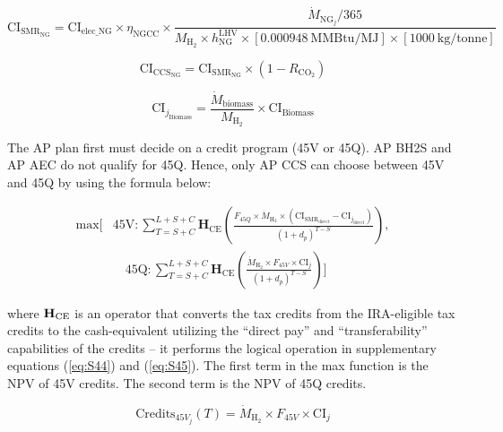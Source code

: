 \documentclass{article}
\begin{document}
\begin{equation}
\text{CI}_{\text{SMR}_{\text{NG}}} = \text{CI}_{\text{elec\_NG}} \times \eta_{\text{NGCC}} \times \frac{\dot{M}_{\text{NG}_j}/365}{M_{\text{H}_2} \times h_{\text{NG}}^{\text{LHV}} \times [0.000948 \ \text{MMBtu/MJ}] \times [1000 \ \text{kg/tonne}]}
\label{eq:S38}
\end{equation}

\begin{equation}
\text{CI}_{\text{CCS}_{\text{NG}}} = \text{CI}_{\text{SMR}_{\text{NG}}} \times (1 - R_{\text{CO}_2})
\label{eq:S39}
\end{equation}

\begin{equation}
\text{CI}_{j_{\text{Biomass}}} = \frac{\dot{M}_{\text{biomass}}}{M_{\text{H}_2}} \times \text{CI}_{\text{Biomass}}
\label{eq:S40}
\end{equation}

The AP plan first must decide on a credit program (45V or 45Q). AP BH2S and AP AEC do not qualify for 45Q. Hence, only AP CCS can choose between 45V and 45Q by using the formula below:

\begin{equation}
\begin{aligned}
\text{max}\Bigg[& \text{45V} : \sum_{T=S+C}^{L+S+C} \mathbf{H}_{\text{CE}} \left(\frac{F_{45Q} \times \dot{M}_{\text{H}_2} \times (\text{CI}_{\text{SMR}_{\text{direct}}} - \text{CI}_{j_{\text{direct}}})}{(1 + d_p)^{T-S}}\right), \\
& \quad \text{45Q} : \sum_{T=S+C}^{L+S+C} \mathbf{H}_{\text{CE}} \left(\frac{\dot{M}_{\text{H}_2} \times F_{45V} \times \text{CI}_j}{(1 + d_p)^{T-S}}\right) \Bigg]
\end{aligned}
\label{eq:S41}
\end{equation}

where \( \textbf{H}\textsubscript{CE} \) is an operator that converts the tax credits from the IRA-eligible tax credits to the cash-equivalent utilizing the “direct pay” and “transferability” capabilities of the credits – it performs the logical operation in supplementary equations (\ref{eq:S44}) and (\ref{eq:S45}). The first term in the max function is the NPV of 45V credits. The second term is the NPV of 45Q credits.

\begin{equation}
\text{Credits}_{45V_j}(T) = \dot{M}_{\text{H}_2} \times F_{45V} \times \text{CI}_j
\label{eq:S42}
\end{equation}
\end{document}

